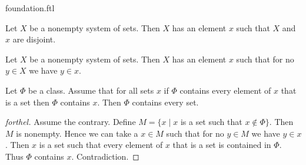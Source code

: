 \documentclass{naproche-library}
\begin{document}
\begin{smodule}[title=The Foundation Axiom]{foundation.ftl}

\begin{axiom}[forthel,title=Foundation,id=FOUNDATIONS_10_1320008569323520]
  Let $X$ be a nonempty system of sets.
  Then $X$ has an element $x$ such that $X$ and $x$ are disjoint.
\end{axiom}

\begin{corollary}[forthel,id=FOUNDATIONS_10_9532145874510315]
  Let $X$ be a nonempty system of sets.
  Then $X$ has an element $x$ such that for no $y \in X$ we have $y \in x$.
\end{corollary}

\begin{proposition}[forthel,id=FOUNDATIONS_11_2812087589928960]
  Let $\Phi$ be a class.
  Assume that for all sets $x$ if $\Phi$ contains every element of $x$ that is a set then $\Phi$ contains $x$.
  Then $\Phi$ contains every set.
\end{proposition}
\begin{proof}[forthel]
  Assume the contrary.
  Define $M = \{ x \mid x$ is a set such that $x \notin \Phi \}$.
  Then $M$ is nonempty.
  Hence we can take a $x \in M$ such that for no $y \in M$ we have $y \in x$.
  Then $x$ is a set such that every element of $x$ that is a set is contained in $\Phi$.
  Thus $\Phi$ contains $x$.
  Contradiction.
\end{proof}
\end{smodule}
\end{document}
